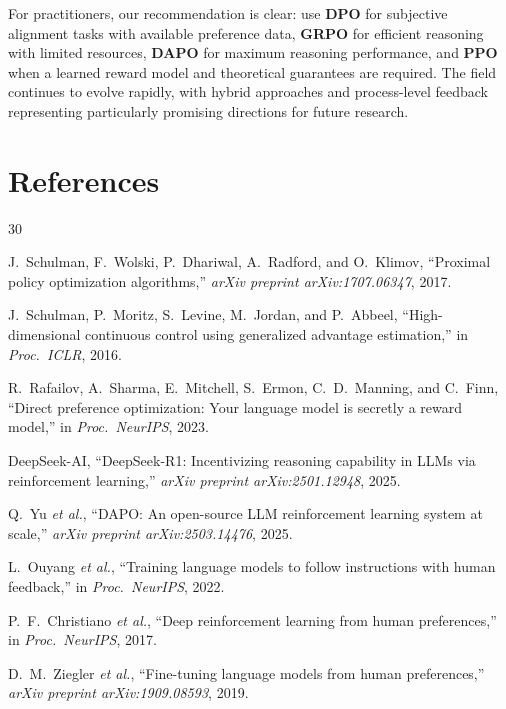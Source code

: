 For practitioners, our recommendation is clear: use \textbf{DPO} for subjective alignment tasks with available preference data, \textbf{GRPO} for efficient reasoning with limited resources, \textbf{DAPO} for maximum reasoning performance, and \textbf{PPO} when a learned reward model and theoretical guarantees are required. The field continues to evolve rapidly, with hybrid approaches and process-level feedback representing particularly promising directions for future research.

\section*{References}
\begin{thebibliography}{30}

J.~Schulman, F.~Wolski, P.~Dhariwal, A.~Radford, and O.~Klimov, ``Proximal policy optimization algorithms,'' \textit{arXiv preprint arXiv:1707.06347}, 2017.

J.~Schulman, P.~Moritz, S.~Levine, M.~Jordan, and P.~Abbeel, ``High-dimensional continuous control using generalized advantage estimation,'' in \textit{Proc.\ ICLR}, 2016.

R.~Rafailov, A.~Sharma, E.~Mitchell, S.~Ermon, C.~D.~Manning, and C.~Finn, ``Direct preference optimization: Your language model is secretly a reward model,'' in \textit{Proc.\ NeurIPS}, 2023.

DeepSeek-AI, ``DeepSeek-R1: Incentivizing reasoning capability in LLMs via reinforcement learning,'' \textit{arXiv preprint arXiv:2501.12948}, 2025.

Q.~Yu \textit{et al.}, ``DAPO: An open-source LLM reinforcement learning system at scale,'' \textit{arXiv preprint arXiv:2503.14476}, 2025.

L.~Ouyang \textit{et al.}, ``Training language models to follow instructions with human feedback,'' in \textit{Proc.\ NeurIPS}, 2022.

P.~F.~Christiano \textit{et al.}, ``Deep reinforcement learning from human preferences,'' in \textit{Proc.\ NeurIPS}, 2017.

D.~M.~Ziegler \textit{et al.}, ``Fine-tuning language models from human preferences,'' \textit{arXiv preprint arXiv:1909.08593}, 2019.


\end{thebibliography}
